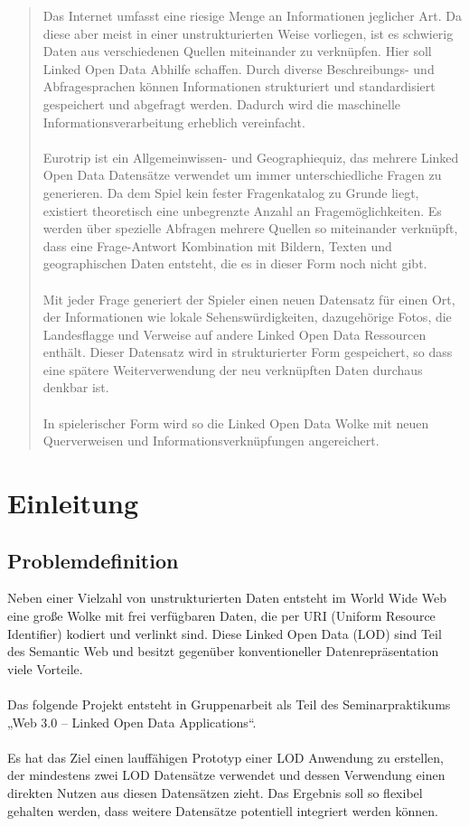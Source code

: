 \documentclass[a4paper, 11pt]{article}
\begin{document}
\begin{abstract}Das Internet umfasst eine riesige Menge an Informationen jeglicher Art. Da diese aber meist in einer unstrukturierten Weise vorliegen, ist es schwierig Daten aus verschiedenen Quellen miteinander zu verknüpfen. Hier soll Linked Open Data Abhilfe schaffen. Durch diverse Beschreibungs- und Abfragesprachen können Informationen strukturiert und standardisiert gespeichert und abgefragt werden. Dadurch wird die maschinelle Informationsverarbeitung erheblich vereinfacht.\\\\
Eurotrip ist ein Allgemeinwissen- und Geographiequiz, das mehrere Linked Open Data Datensätze verwendet um immer unterschiedliche Fragen zu generieren. Da dem Spiel kein fester Fragenkatalog zu Grunde liegt, existiert theoretisch eine unbegrenzte Anzahl an Fragemöglichkeiten. Es werden über spezielle Abfragen mehrere Quellen so miteinander verknüpft, dass eine Frage-Antwort Kombination mit Bildern, Texten und geographischen Daten entsteht, die es in dieser Form noch nicht gibt.\\\\
Mit jeder Frage generiert der Spieler einen neuen Datensatz für einen Ort, der Informationen wie lokale Sehenswürdigkeiten, dazugehörige Fotos, die Landesflagge und Verweise auf andere Linked Open Data Ressourcen enthält. Dieser Datensatz wird in strukturierter Form gespeichert, so dass eine spätere Weiterverwendung der neu verknüpften Daten durchaus denkbar ist. \\\\
In spielerischer Form wird so die Linked Open Data Wolke mit neuen Querverweisen und Informationsverknüpfungen angereichert.
\end{abstract}
\thispagestyle{empty}
\newpage
\tableofcontents
\setcounter{page}{1}

\newpage
\setcounter{page}{1}
\section{Einleitung}
\subsection{Problemdefinition}
Neben einer Vielzahl von unstrukturierten Daten entsteht im World Wide Web eine große Wolke mit frei verfügbaren Daten,  die per URI (Uniform Resource Identifier) kodiert und verlinkt sind. Diese Linked Open Data (LOD) sind Teil des Semantic Web und besitzt gegenüber konventioneller Datenrepräsentation viele Vorteile.\\\\
Das folgende Projekt entsteht in Gruppenarbeit als Teil des Seminarpraktikums „Web 3.0 – Linked Open Data Applications“. \\\\
Es hat das Ziel einen lauffähigen Prototyp einer LOD Anwendung zu erstellen, der mindestens zwei LOD Datensätze verwendet und dessen Verwendung einen direkten Nutzen aus diesen Datensätzen zieht. Das Ergebnis soll so flexibel gehalten werden, dass weitere Datensätze potentiell integriert werden können. 
\end{document}
